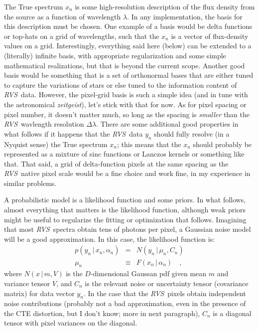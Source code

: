 \documentclass[11pt]{article}
\newcommand{\given}{\,|\,}
\newcommand{\foreign}[1]{\textsl{#1}}
\newcommand{\instrument}[1]{\textsl{#1}}
\newcommand{\RVS}{\instrument{RVS}}
\begin{document}
The True spectrum $x_n$ is some high-resolution description of the
flux density from the source as a function of wavelength $\lambda$.
In any implementation, the basis for this description must be chosen.
One example of a basis would be delta functions or top-hats on a grid
of wavelengths, such that the $x_n$ is a vector of flux-density values
on a grid.
Interestingly, everything said here (below) can be extended to a
(literally) infinite basis, with appropriate regularization and some
simple mathematical realizations, but that is beyond the current
scope.
Another good basis would be something that is a set of orthonormal
bases that are either tuned to capture the variations of stars or else
tuned to the information content of \RVS\ data.
However, the pixel-grid basis is such a simple idea (and in tune with
the astronomical \foreign{zeitgeist}), let's stick with that for now.
As for pixel spacing or pixel number, it doesn't matter much, so long
as the spacing is \emph{smaller} than the \RVS\ wavlength resolution
$\Delta\lambda$.
There are some additional good properties in what follows if it
happens that the \RVS\ data $y_n$ should fully resolve (in a Nyquist
sense) the True spectrum $x_n$; this means that the $x_n$ should
probably be represented as a mixture of sinc functions or Lanczos
kernels or something like that.
That said, a grid of delta-function pixels at the same spacing as the
\RVS\ native pixel scale would be a fine choice and work fine, in my
experience in similar problems.

A probabilistic model is a likelihood function and some priors.
In what follows, almost everything that matters is the likelihood
function, although weak priors might be useful to regularize the
fitting or optimization that follows.
Imagining that most \RVS\ spectra obtain tens of photons per pixel, a
Gaussian noise model will be a good approximation.
In this case, the likelihood function is:
\begin{eqnarray}
p(y_n\given x_n, \alpha_n) &=& N(y_n\given \mu_n, C_n)
\\
\mu_n &\equiv& F(x_n\given \alpha_n)
\quad ,
\end{eqnarray}
where $N(x\given m,V)$ is the $D$-dimensional Gaussan pdf given mean
$m$ and variance tensor $V$, and $C_n$ is the relevant noise or
uncertainty tensor (covariance matrix) for data vector $y_n$.  In the
case that the \RVS\ pixels obtain independent noise contributions
(probably not a bad approximation, even in the presence of the CTE
distortion, but I don't know; more in next paragraph), $C_n$ is a
diagonal tensor with pixel variances on the diagonal.
\end{document}
